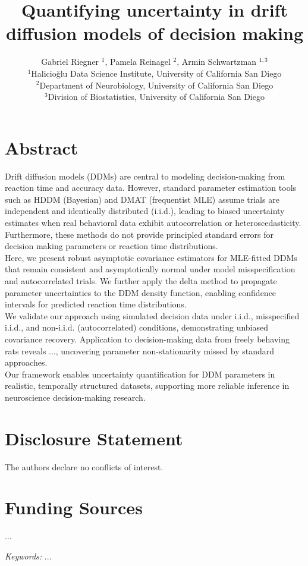 \documentclass[9pt]{article}
\title{\Large Quantifying uncertainty in drift diffusion models of decision making}
\author{Gabriel Riegner $^{1}$, Pamela Reinagel $^{2}$, Armin Schwartzman $^{1,3}$\\
{\small $^{1}$Halicio\u{g}lu Data Science Institute, University of California San Diego}\\
{\small $^{2}$Department of Neurobiology, University of California San Diego}\\
{\small $^{3}$Division of Biostatistics, University of California San Diego}\\
}
\date{}
\begin{document}
\maketitle

\section*{Abstract}
Drift diffusion models (DDMs) are central to modeling decision-making from reaction time and accuracy data. However, standard parameter estimation tools such as HDDM (Bayesian) and DMAT (frequentist MLE) assume trials are independent and identically distributed (i.i.d.), leading to biased uncertainty estimates when real behavioral data exhibit autocorrelation or heteroscedasticity. Furthermore, these methods do not provide principled standard errors for decision making parameters or reaction time distributions.\\

\noindent Here, we present robust asymptotic covariance estimators for MLE-fitted DDMs that remain consistent and asymptotically normal under model misspecification and autocorrelated trials. We further apply the delta method to propagate parameter uncertainties to the DDM density function, enabling confidence intervals for predicted reaction time distributions.\\

\noindent We validate our approach using simulated decision data under i.i.d., misspecified i.i.d., and non-i.i.d. (autocorrelated) conditions, demonstrating unbiased covariance recovery. Application to decision-making data from freely behaving rats reveals ..., uncovering parameter non-stationarity missed by standard approaches.\\

\noindent Our framework enables uncertainty quantification for DDM parameters in realistic, temporally structured datasets, supporting more reliable inference in neuroscience decision-making research.


\section*{Disclosure Statement}
The authors declare no conflicts of interest.

\section*{Funding Sources}
...

\vfill
\noindent\textit{Keywords:} ...
\end{document}
